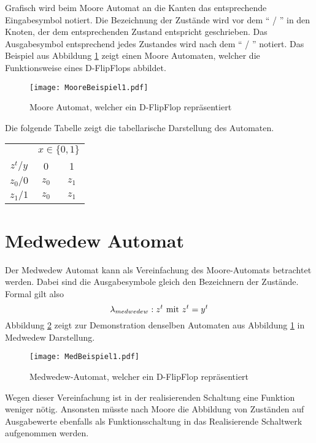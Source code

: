 Grafisch wird beim Moore Automat an die Kanten das entsprechende Eingabesymbol notiert. Die Bezeichnung der Zustände wird vor dem "` / "' in den Knoten, der dem entsprechenden Zustand entspricht geschrieben. Das Ausgabesymbol entsprechend jedes Zustandes wird nach dem "` / "' notiert. Das Beispiel aus Abbildung \ref{mooreBsp1} zeigt einen Moore Automaten, welcher die Funktionsweise eines D-FlipFlops abbildet.
\begin{figure}[htp]
	\centering
	\texttt{[image: MooreBeispiel1.pdf]}
	\caption{Moore Automat, welcher ein D-FlipFlop repräsentiert}
	\label{mooreBsp1}
\end{figure}

Die folgende Tabelle zeigt die tabellarische Darstellung des Automaten.

\begin{center}
\begin{tabular}{c|cc}
		& \multicolumn{2}{|c}{$x \in \{0,1\}$}\\
		$z^t/y$ & 0 & 1\\ \hline
		$z_0/0$ & $z_0$ & $z_1$\\
		$z_1/1$ & $z_0$ & $z_1$\\
\end{tabular}
\end{center}

\section{Medwedew Automat}
Der Medwedew Automat kann als Vereinfachung des Moore-Automats betrachtet werden. Dabei sind die Ausgabesymbole gleich den Bezeichnern der Zustände. Formal gilt also
$$
	\lambda_{medwedew} : z^t \textnormal{ mit } z^t = y^t
$$
Abbildung \ref{medBsp1} zeigt zur Demonstration denselben Automaten aus Abbildung \ref{mooreBsp1} in Medwedew Darstellung.
\begin{figure}[htp]
	\centering
	\texttt{[image: MedBeispiel1.pdf]}
	\caption{Medwedew-Automat, welcher ein D-FlipFlop repräsentiert}
	\label{medBsp1}
\end{figure}

Wegen dieser Vereinfachung ist in der realisierenden Schaltung eine Funktion weniger nötig. Ansonsten müsste nach Moore die Abbildung von Zuständen auf Ausgabewerte ebenfalls als Funktionsschaltung in das Realisierende Schaltwerk aufgenommen werden.


